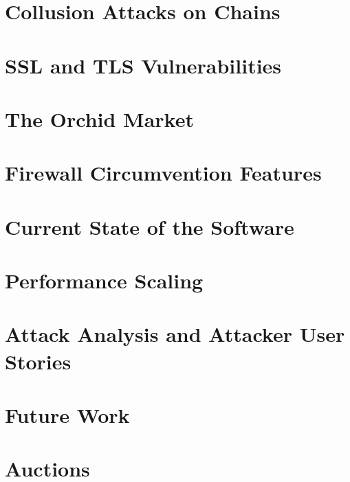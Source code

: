 \documentclass{article}
\newcommand{\orchid}{Orchid}
\newcommand{\Orchid}{\orchid}
\newcommand{\TOM}{The \Orchid{} Market}
\begin{document}
\section{Collusion Attacks on Chains}
\label{sec:collusion-attacks}


\section{SSL and TLS Vulnerabilities}


\section{\TOM{}}
\label{sec:agora}


\section{Firewall Circumvention Features}
\label{sec:evasion}


\section{Current State of the Software}
\label{sec:current}


\section{Performance Scaling}
\label{sec:performance}


\section{Attack Analysis and Attacker User Stories}
\label{sec:attack-stories}


\section{Future Work}
\label{sec:future}


\newpage

\printbibliography

\newpage

\appendix

\section{Auctions}
\label{sec:auctions}

\end{document}
